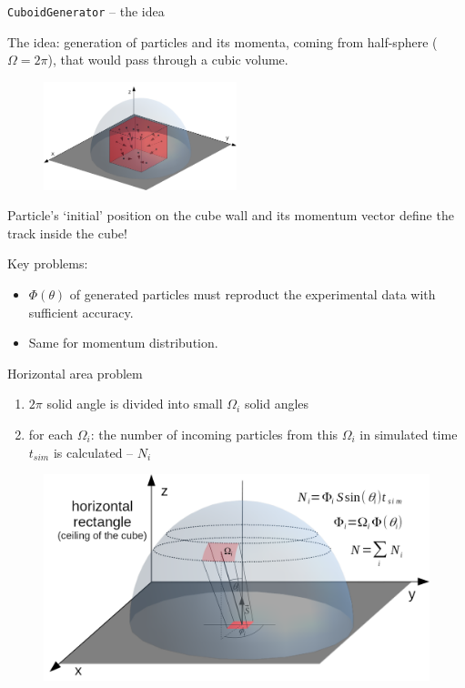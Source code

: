 \documentclass{beamer}
\begin{document}
\begin{frame}{\texttt{CuboidGenerator} -- the idea}

The idea: generation of particles and its momenta, coming from half-sphere ($\Omega=2\pi$), that would pass through a cubic volume.
\begin{figure}
\includegraphics[width=0.5\textwidth]{images/cuboidIdea.png}
\end{figure}
Particle's `initial' position on the cube wall and its momentum vector define the track inside the cube!

Key problems:
\begin{itemize}
\item $\Phi(\theta)$ of generated particles must reproduct the experimental data with sufficient accuracy.
\item Same for momentum distribution.
\end{itemize}
\end{frame}

\begin{frame}{Horizontal area problem}

\begin{enumerate}
\item $2\pi$ solid angle is divided into small $\Omega_i$ solid angles
\item for each $\Omega_i$: the number of incoming particles from this $\Omega_i$ in simulated time $t_{sim}$ is calculated -- $N_i$  
\end{enumerate}

\begin{figure}
\includegraphics[width=\textwidth]{images/hor.png}
\end{figure}
\end{frame}
\end{document}
